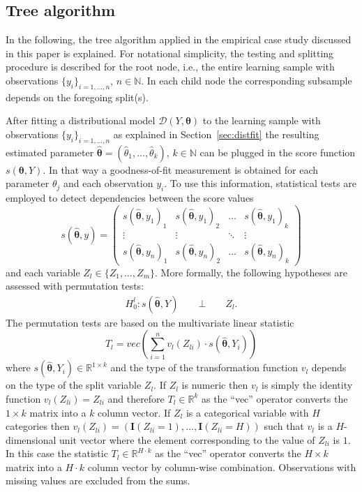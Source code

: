 \documentclass[aoas, preprint]{imsart}
\newcommand{\I}{\mathbf{I}}
\numberwithin{equation}{subsection}
\begin{document}
\pagebreak
\begin{appendix}
\section{Tree algorithm}
\label{app:tree}

In the following, the tree algorithm applied in the empirical case study 
discussed in this paper is explained. For notational simplicity, 
the testing and splitting procedure is described for the root node, i.e.,
the entire learning sample with observations $\{y_i\}_{i = 1,\ldots,n}$, $n \in \mathbb{N}$.
In each child node the corresponding subsample depends on 
the foregoing split(s).

After fitting a distributional model $\mathcal{D}(Y, \bm{\theta})$ to 
the learning sample with observations $\{y_i\}_{i = 1,\ldots,n}$ as explained in 
Section~\ref{sec:distfit} the resulting estimated parameter 
$\bm{\hat{\theta}} = 
(\hat{\theta}_1, \ldots, \hat{\theta}_k)$, $k \in \mathbb{N}$ 
can be plugged in the score function $s(\bm{\theta}, Y)$.
In that way a goodness-of-fit measurement is obtained for each
parameter $\theta_j$ and each observation $y_i$.
To use this information, statistical tests are employed to detect
dependencies between the score values
\begin{equation}
s(\bm{\hat{\theta}}, y) = 
\begin{pmatrix} 
s(\bm{\hat{\theta}}, y_1)_1 & s(\bm{\hat{\theta}}, y_1)_2 & \ldots & s(\bm{\hat{\theta}}, y_1)_k\\
\vdots & \vdots & \ddots & \vdots \\
s(\bm{\hat{\theta}}, y_n)_1 & s(\bm{\hat{\theta}}, y_n)_2 & \ldots & s(\bm{\hat{\theta}}, y_n)_k
\end{pmatrix}
\end{equation}
and each variable $Z_l \in \{Z_1, \ldots, Z_m\}$.  
More formally, the following hypotheses are assessed with permutation tests:
\begin{align}
H_0^l:  s(\bm{\hat{\theta}}, Y) \qquad \bot \qquad Z_l.
\end{align}
%
The permutation tests are based on the multivariate linear statistic
\begin{equation}
T_l = vec\left(\sum_{i=1}^n v_l(Z_{li}) \cdot s(\bm{\hat{\theta}}, Y_i)\right)
\end{equation}
where $s(\bm{\hat{\theta}}, Y_i) \in \mathbb{R}^{1\times k}$ and the 
type of the transformation function $v_l$ depends on the type of the split 
variable $Z_l$. If $Z_l$ is numeric then $v_l$ is simply the identity 
function $v_l(Z_{li}) = Z_{li}$ and therefore $T_l \in \mathbb{R}^k$ as 
the ``vec'' operator converts the $1 \times k$ matrix into a $k$ column vector. 
If $Z_l$ is a categorical variable with $H$ categories then 
$v_l(Z_{li}) = (\I(Z_{li} = 1), \ldots, \I(Z_{li} = H))$ 
such that $v_l$ is a $H$-dimensional unit vector where the element corresponding to 
the value of $Z_{li}$ is $1$. In this case the statistic $T_l \in \mathbb{R}^{H \cdot k}$
as the ``vec'' operator converts the $H \times k$ matrix into a $H \cdot k$ column vector 
by column-wise combination. Observations with missing values are excluded from the sums.


\end{appendix}
\end{document}
